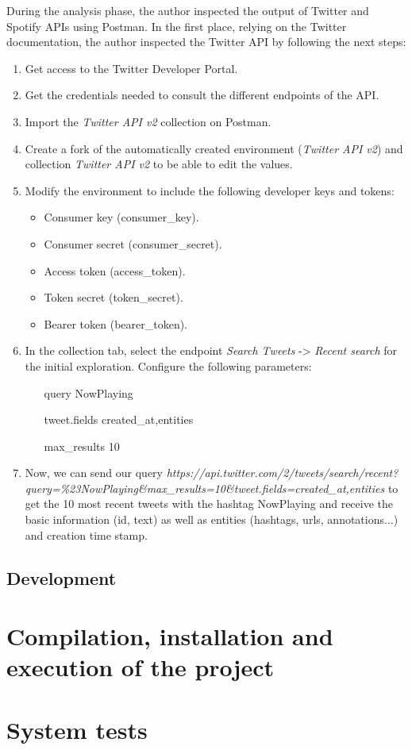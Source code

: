 \nonzeroparskip During the analysis phase, the author inspected the output of Twitter and Spotify APIs using Postman. In the first place, relying on the Twitter documentation, the author inspected the Twitter API by following the next steps:
\begin{enumerate}
	\item Get access to the Twitter Developer Portal.
	\item Get the credentials needed to consult the different endpoints of the API.
	\item Import the \textit{Twitter API v2} collection on Postman.
	\item Create a fork of the automatically created environment (\textit{Twitter API v2}) and collection \textit{Twitter API v2} to be able to edit the values.
	\item Modify the environment to include the following developer keys and tokens:
	\begin{itemize}
		\item Consumer key (consumer\_key).
		\item Consumer secret (consumer\_secret).
		\item Access token (access\_token).
		\item Token secret (token\_secret).
		\item Bearer token (bearer\_token).
	\end{itemize}
	\item In the collection tab, select the endpoint \textit{Search Tweets} -> \textit{Recent search} for the initial exploration. Configure the following parameters:
	\begin{itemize}
		\item[query]  NowPlaying
		\item[tweet.fields] created_at,entities
		\item[max_results] 10
	\end{itemize}
	\item Now, we can send our query \textit{https://api.twitter.com/2/tweets/search/recent?query=\%23NowPlaying&max_results=10&tweet.fields=created_at,entities} to get the 10 most recent tweets with the hashtag  NowPlaying and receive the basic information (id, text) as well as entities (hashtags, urls, annotations...) and creation time stamp.
\end{enumerate}

\subsection{Development}

\section{Compilation, installation and execution of the project}


\section{System tests}


